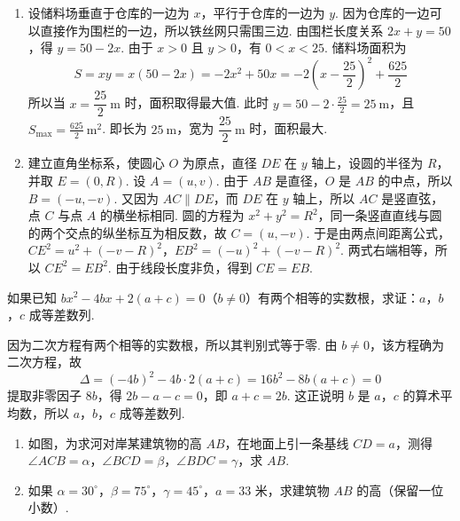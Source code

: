 \begin{solution}
\begin{enumerate}
\item 设储料场垂直于仓库的一边为 \(x\)，平行于仓库的一边为 \(y\). 因为仓库的一边可以直接作为围栏的一边，所以铁丝网只需围三边. 由围栏长度关系 \(2x+y=50\)，得 \(y=50-2x\).
由于 \(x>0\) 且 \(y>0\)，有 \(0<x<25\). 储料场面积为
\[
S=xy=x\left(50-2x\right)=-2x^2+50x
=-2\left(x-\frac{25}{2}\right)^2+\frac{625}{2}
\]
所以当 \(x=\dfrac{25}{2}\mathrm{~m}\) 时，面积取得最大值. 此时 \(y=50-2\cdot\frac{25}{2}=25\mathrm{~m}\)，且 \(S_{\max}=\frac{625}{2}\mathrm{~m}^2\).
即长为 \(25\mathrm{~m}\)，宽为 \(\dfrac{25}{2}\mathrm{~m}\) 时，面积最大.

\item 建立直角坐标系，使圆心 \(O\) 为原点，直径 \(DE\) 在 \(y\) 轴上，设圆的半径为 \(R\)，并取 \(E=\left(0,R\right)\). 设
\(A=\left(u,v\right)\).
由于 \(AB\) 是直径，\(O\) 是 \(AB\) 的中点，所以
\(B=\left(-u,-v\right)\).
又因为 \(AC\parallel DE\)，而 \(DE\) 在 \(y\) 轴上，所以 \(AC\) 是竖直弦，点 \(C\) 与点 \(A\) 的横坐标相同. 圆的方程为 \(x^2+y^2=R^2\)，同一条竖直直线与圆的两个交点的纵坐标互为相反数，故
\(C=\left(u,-v\right)\).
于是由两点间距离公式，\(CE^2=u^2+\left(-v-R\right)^2\)，\(EB^2=\left(-u\right)^2+\left(-v-R\right)^2\).
两式右端相等，所以 \(CE^2=EB^2\). 由于线段长度非负，得到 \(CE=EB\).
\end{enumerate}
\end{solution}

\begin{problem}
如果已知 \(bx^2-4bx+2\left(a+c\right)=0\)（\(b\neq0\)）有两个相等的实数根，求证：\(a\)，\(b\)，\(c\) 成等差数列.
\end{problem}

\begin{solution}
因为二次方程有两个相等的实数根，所以其判别式等于零. 由 \(b\neq0\)，该方程确为二次方程，故
\[
\Delta=\left(-4b\right)^2-4b\cdot2\left(a+c\right)
=16b^2-8b\left(a+c\right)=0
\]
提取非零因子 \(8b\)，得 \(2b-a-c=0\)，即 \(a+c=2b\).
这正说明 \(b\) 是 \(a\)，\(c\) 的算术平均数，所以 \(a\)，\(b\)，\(c\) 成等差数列.
\end{solution}

\begin{problem}
\begin{enumerate}
\item 如图，为求河对岸某建筑物的高 \(AB\)，在地面上引一条基线 \(CD=a\)，测得 \(\angle ACB=\alpha\)，\(\angle BCD=\beta\)，\(\angle BDC=\gamma\)，求 \(AB\).

\item 如果 \(\alpha=30^\circ\)，\(\beta=75^\circ\)，\(\gamma=45^\circ\)，\(a=33\text{ 米}\)，求建筑物 \(AB\) 的高（保留一位小数）.

\end{enumerate}
\end{problem}

